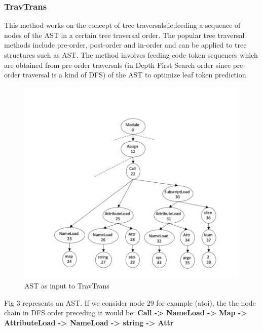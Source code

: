 \documentclass[sigplan,screen,9pt]{acmart}
\begin{document}
\subsubsection{TravTrans}
This method works on the concept of tree traversals;ie;feeding a sequence of nodes of the AST in a certain tree traversal order. The popular tree traversal methods include pre-order, post-order and in-order and can be applied to tree structures such as AST. The method involves feeding code token sequences which are obtained from pre-order traversals (in Depth First Search order since pre-order traversal is a kind of DFS) of the AST to optimize leaf token prediction.
\begin{figure}[h]
  \centering
  \includegraphics[width=\linewidth]{figs/dfs.png}
  \caption{AST as input to TravTrans}
\end{figure}
Fig 3 represents an AST. If we consider node 29 for example (atoi), the the node chain in DFS order preceding it would be:
\newline
\textbf{Call -> NameLoad -> Map -> AttributeLoad -> NameLoad -> string -> Attr}
\end{document}
